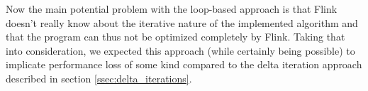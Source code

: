 
Now the main potential problem with the loop-based approach is that Flink
doesn't really know about the iterative nature of the implemented algorithm and
that the program can thus not be optimized completely by Flink. Taking that
into consideration, we expected this approach (while certainly being possible)
to implicate performance loss of some kind compared to the delta iteration
approach described in section \ref{ssec:delta_iterations}.

